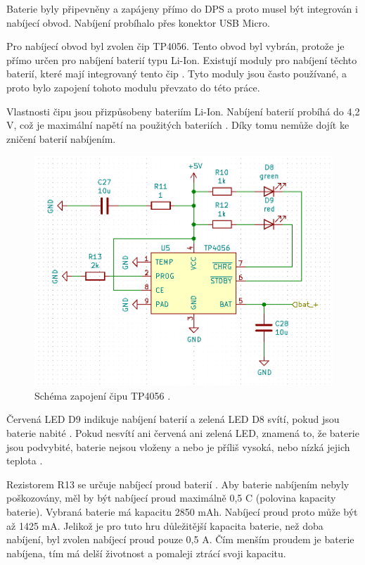   Baterie byly připevněny a zapájeny přímo do DPS a proto musel být integrován i nabíjecí obvod. Nabíjení probíhalo přes konektor USB Micro.

  Pro nabíjecí obvod byl zvolen čip TP4056. Tento obvod byl vybrán, protože je přímo určen pro nabíjení baterií typu Li-Ion. Existují 
  moduly pro nabíjení těchto baterií, které mají integrovaný tento čip \cite{Nabijeci_modul}. Tyto moduly jsou často používané, a proto 
  bylo zapojení tohoto modulu převzato do této práce. 

  Vlastnosti čipu jsou přizpůsobeny bateriím Li-Ion. Nabíjení baterií probíhá do 4,2 V, což je maximální napětí na použitých 
  bateriích \cite{18650} \cite{TP4056_datasheet}. Díky tomu nemůže dojít ke zničení baterií nabíjením.

  \begin{figure}[!h]
    \begin{center}
      \includegraphics[scale=0.6]{obrazky/TP4056_schema.png}
    \end{center}
    \caption[Schéma zapojení čipu TP4056]{Schéma zapojení čipu TP4056 \cite{TP4056_datasheet}.}
  \end{figure}

  Červená LED D9 indikuje nabíjení baterií a  zelená LED D8 svítí, pokud jsou baterie nabité \cite{TP4056_datasheet}. 
  Pokud nesvítí ani červená ani zelená LED, znamená to, že baterie jsou podvybité, baterie nejsou vloženy a nebo je příliš vysoká, 
  nebo nízká jejich teplota \cite{TP4056_datasheet}.

  Rezistorem R13 se určuje nabíjecí proud baterií \cite{TP4056_datasheet}. Aby baterie nabíjením nebyly poškozovány, měl by být nabíjecí 
  proud maximálně 0,5 C (polovina kapacity baterie). Vybraná baterie má kapacitu 2850 mAh. Nabíjecí proud proto může být až 1425 mA. 
  Jelikož je pro tuto hru důležitější kapacita baterie, než doba nabíjení, byl zvolen nabíjecí proud pouze 0,5 A. Čím menším proudem 
  je baterie nabíjena, tím má delší životnost a pomaleji ztrácí svoji kapacitu.

